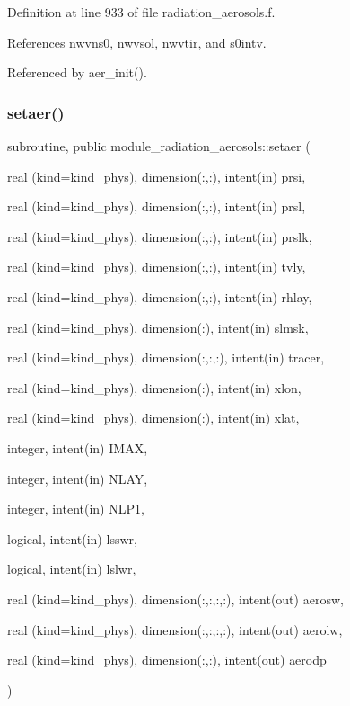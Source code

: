 Definition at line 933 of file radiation\+\_\+aerosols.\+f.



References nwvns0, nwvsol, nwvtir, and s0intv.



Referenced by aer\+\_\+init().

\mbox{\label{group__module__radiation__aerosols_ga184fcc0618c1c4d42fa08cfe1e20e5c1}} 
\subsubsection{\texorpdfstring{setaer()}{setaer()}}
{\footnotesize\ttfamily subroutine, public module\+\_\+radiation\+\_\+aerosols\+::setaer (\begin{DoxyParamCaption}\item[{real (kind=kind\+\_\+phys), dimension(\+:,\+:), intent(in)}]{prsi,  }\item[{real (kind=kind\+\_\+phys), dimension(\+:,\+:), intent(in)}]{prsl,  }\item[{real (kind=kind\+\_\+phys), dimension(\+:,\+:), intent(in)}]{prslk,  }\item[{real (kind=kind\+\_\+phys), dimension(\+:,\+:), intent(in)}]{tvly,  }\item[{real (kind=kind\+\_\+phys), dimension(\+:,\+:), intent(in)}]{rhlay,  }\item[{real (kind=kind\+\_\+phys), dimension(\+:), intent(in)}]{slmsk,  }\item[{real (kind=kind\+\_\+phys), dimension(\+:,\+:,\+:), intent(in)}]{tracer,  }\item[{real (kind=kind\+\_\+phys), dimension(\+:), intent(in)}]{xlon,  }\item[{real (kind=kind\+\_\+phys), dimension(\+:), intent(in)}]{xlat,  }\item[{integer, intent(in)}]{I\+M\+AX,  }\item[{integer, intent(in)}]{N\+L\+AY,  }\item[{integer, intent(in)}]{N\+L\+P1,  }\item[{logical, intent(in)}]{lsswr,  }\item[{logical, intent(in)}]{lslwr,  }\item[{real (kind=kind\+\_\+phys), dimension(\+:,\+:,\+:,\+:), intent(out)}]{aerosw,  }\item[{real (kind=kind\+\_\+phys), dimension(\+:,\+:,\+:,\+:), intent(out)}]{aerolw,  }\item[{real (kind=kind\+\_\+phys), dimension(\+:,\+:), intent(out)}]{aerodp }\end{DoxyParamCaption})}


